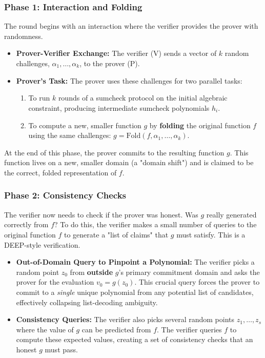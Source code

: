\documentclass{article}
\begin{document}
\subsubsection{Phase 1: Interaction and Folding}
The round begins with an interaction where the verifier provides the prover with randomness.
\begin{itemize}
    \item \textbf{Prover-Verifier Exchange:} The verifier (V) sends a vector of $k$ random challenges, $\alpha_1, \dots, \alpha_k$, to the prover (P).
    \item \textbf{Prover's Task:} The prover uses these challenges for two parallel tasks:
    \begin{enumerate}
        \item To run $k$ rounds of a sumcheck protocol on the initial algebraic constraint, producing intermediate sumcheck polynomials $\hat{h}_i$.
        \item To compute a new, smaller function $g$ by \textbf{folding} the original function $f$ using the same challenges: $g = \text{Fold}(f, \alpha_1, \dots, \alpha_k)$.
    \end{enumerate}
\end{itemize}
At the end of this phase, the prover commits to the resulting function $g$. This function lives on a new, smaller domain (a "domain shift") and is claimed to be the correct, folded representation of $f$.

\subsubsection{Phase 2: Consistency Checks}
The verifier now needs to check if the prover was honest. Was $g$ really generated correctly from $f$? To do this, the verifier makes a small number of queries to the original function $f$ to generate a "list of claims" that $g$ must satisfy. This is a DEEP-style verification.
\begin{itemize}
    \item \textbf{Out-of-Domain Query to Pinpoint a Polynomial:} The verifier picks a random point $z_0$ from \textbf{outside} $g$'s primary commitment domain and asks the prover for the evaluation $v_0 = g(z_0)$. This crucial query forces the prover to commit to a \textit{single} unique polynomial from any potential list of candidates, effectively collapsing list-decoding ambiguity.
    \item \textbf{Consistency Queries:} The verifier also picks several random points $z_1, \dots, z_s$ where the value of $g$ can be predicted from $f$. The verifier queries $f$ to compute these expected values, creating a set of consistency checks that an honest $g$ must pass.
\end{itemize}
\end{document}
